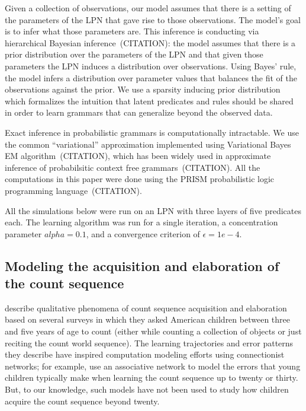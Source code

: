 \documentclass[10pt,letterpaper]{article}
\begin{document}
Given a collection of observations, our model assumes that there is a
setting of the parameters of the LPN that gave rise to those
observations. The model's goal is to infer what those parameters
are. This inference is conducting via hierarchical Bayesian
inference~(CITATION): the model assumes that there is a prior
distribution over the parameters of the LPN and that given those
parameters the LPN induces a distribution over observations. Using
Bayes' rule, the model infers a distribution over parameter values
that balances the fit of the observations against the prior. We use a
sparsity inducing prior distribution which formalizes the intuition
that latent predicates and rules should be shared in order to learn
grammars that can generalize beyond the observed data.

Exact inference in probabilistic grammars is computationally
intractable. We use the common ``variational'' approximation
implemented using Variational Bayes EM algorithm~(CITATION), which has
been widely used in approximate inference of probabilsitic context
free grammars~(CITATION). All the computations in this paper were done
using the PRISM probabilistic logic programming language~(CITATION).

All the simulations below were run on an LPN with three layers of five
predicates each. The learning algorithm was run for a single
iteration, a concentration parameter $alpha=0.1$, and a convergence
criterion of $\epsilon=1e-4$.

\subsection{Modeling the acquisition and elaboration of the count sequence}

\citet{FusRicBriar1982} describe qualitative phenomena of
count sequence acquisition and elaboration based on several surveys in
which they asked American children between three and five years of age
to count (either while counting a collection of objects or just
reciting the count world sequence). The learning trajectories and
error patterns they describe have inspired computation modeling
efforts using connectionist networks; for example,
\citet{ma1989modeling} use an associative network to model the errors
that young children typically make when learning the count sequence up
to twenty or thirty. But, to our knowledge, such models have not been
used to study how children acquire the count sequence beyond twenty.
\end{document}
